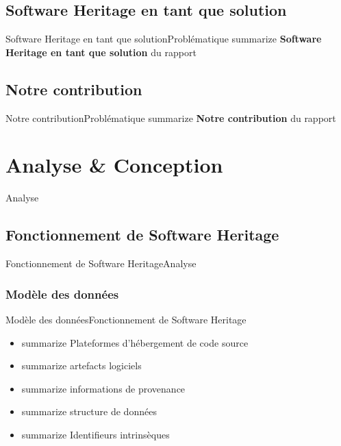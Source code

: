\documentclass{beamer}
\begin{document}
  \subsection{Software Heritage en tant que solution}
    \begin{frame}{Software Heritage en tant que solution}{Problématique}
      summarize \textbf{Software Heritage en tant que solution} du rapport
    \end{frame}

  \subsection{Notre contribution}
    \begin{frame}{Notre contribution}{Problématique}
      summarize \textbf{Notre contribution} du rapport
    \end{frame}

\section{Analyse \& Conception}
  \begin{frame}{Analyse}
  \end{frame}

  \subsection{Fonctionnement de Software Heritage}
    \begin{frame}{Fonctionnement de Software Heritage}{Analyse}
    \end{frame}

    \subsubsection{Modèle des données}
      \begin{frame}{Modèle des données}{Fonctionnement de Software Heritage}
      \begin{itemize}
        \item summarize Plateformes d’hébergement de code source
        \item summarize artefacts logiciels
        \item summarize informations de provenance
        \item summarize structure de données
        \item summarize Identifieurs intrinsèques
      \end{itemize}
      \end{frame}
\end{document}
